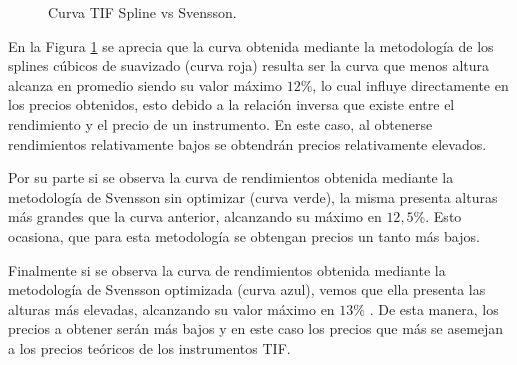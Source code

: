 \newpage

\begin{figure}[h]
\caption{Curva TIF Spline vs Svensson.}
\label{curva_spline_comp_tif}
\end{figure}

\hspace{0.4cm} En la Figura \ref{curva_spline_comp_tif} se aprecia que la curva obtenida mediante la metodolog\'ia de los splines c\'ubicos de suavizado (curva roja) resulta ser la curva que menos altura alcanza en promedio siendo su valor m\'aximo $12 \%$, lo cual influye directamente en los precios obtenidos, esto debido a la relaci\'on inversa que existe entre el rendimiento y el precio de un instrumento. En este caso, al obtenerse rendimientos relativamente bajos se obtendr\'an precios relativamente elevados. 

\hspace{0.4cm} Por su parte si se observa la curva de rendimientos obtenida mediante la metodolog\'ia de Svensson sin optimizar (curva verde), la misma presenta alturas m\'as grandes que la curva anterior, alcanzando su m\'aximo en $12,5 \%$. Esto ocasiona, que para esta metodolog\'ia se obtengan precios un tanto m\'as bajos.

\hspace{0.4cm} Finalmente si se observa la curva de rendimientos obtenida mediante la metodolog\'ia de Svensson optimizada (curva azul), vemos que ella presenta las alturas m\'as elevadas, alcanzando su valor m\'aximo en $13 \%$ . De esta manera, los precios a obtener ser\'an m\'as bajos y en este caso los precios que m\'as se asemejan a los precios te\'oricos de los instrumentos TIF.




